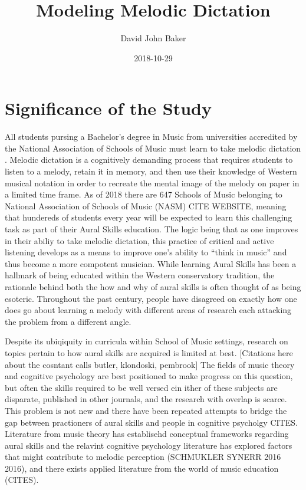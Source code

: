 \documentclass[]{book}
\title{Modeling Melodic Dictation}
\author{David John Baker}
\date{2018-10-29}
\theoremstyle{definition}
\theoremstyle{definition}
\theoremstyle{definition}
\theoremstyle{remark}
\begin{document}
\maketitle

{
\setcounter{tocdepth}{1}
\tableofcontents
}
\hypertarget{significance-of-the-study}{%
\chapter{Significance of the Study}\label{significance-of-the-study}}

All students pursing a Bachelor's degree in Music from universities
accredited by the National Association of Schools of Music must learn to
take melodic dictation \citep[ Section
VIII.6.B.2.A]{NationalAssociationSchools2018}. Melodic dictation is a
cognitively demanding process that requires students to listen to a
melody, retain it in memory, and then use their knowledge of Western
musical notation in order to recreate the mental image of the melody on
paper in a limited time frame. As of 2018 there are 647 Schools of Music
belonging to National Association of Schools of Music (NASM) CITE
WEBSITE, meaning that hundereds of students every year will be expected
to learn this challenging task as part of their Aural Skills education.
The logic being that as one improves in their abiliy to take melodic
dictation, this practice of critical and active listening develops as a
means to improve one's ability to ``think in music'' and thus become a
more compotent musician. While learning Aural Skills has been a hallmark
of being educated within the Western conservatory tradition, the
rationale behind both the how and why of aural skills is often thought
of as being esoteric. Throughout the past century, people have disagreed
on exactly how one does go about learning a melody with different areas
of research each attacking the problem from a different angle.

Despite its ubiqiquity in curricula within School of Music settings,
research on topics pertain to how aural skills are acquired is limited
at best. {[}Citations here about the cosntant calls butler, klondoski,
pembrook{]} The fields of music theory and cognitive psychology are best
positioned to make progress on this question, but often the skills
required to be well versed ein ither of these subjects are disparate,
published in other journals, and the research with overlap is scarce.
This problem is not new and there have been repeated attempts to bridge
the gap between practioners of aural skills and people in cognitive
psycholgy CITES. Literature from music theory has establisehd conceptual
frameworks regarding aural skills
\citet{karpinskiAuralSkillsAcquisition2000} and the relavint cognitive
psychology literature has explored factors that might contribute to
melodic perception (SCHMUKLER SYNERR 2016 2016), and there exists
applied literature from the world of music education (CITES).
\end{document}
